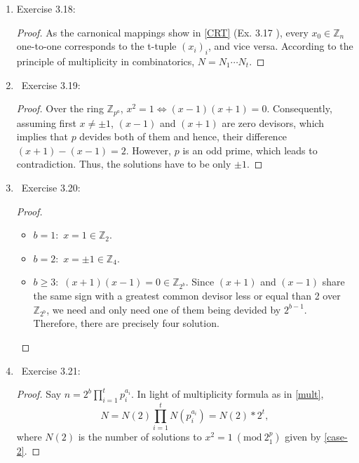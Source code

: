 \documentclass[11pt]{article}
\newcommand\0{\mathbf{0}}
\newcommand\ZZ{\mathbb{Z}}
\newcommand\<{\langle}
\renewcommand\>{\rangle}
\renewcommand\iff{\Leftrightarrow}
\renewcommand\mod[1]{\ (\mathrm{mod}\ #1)}
\begin{document}
\begin{enumerate}
\begin{proof}
  $(\Leftarrow)$: Assume that $f(x_i) \equiv 0 \mod{p_i^{a_i}}$ for each $i$. Equivalently speaking, $f(x_i) = 0 \in \ZZ_{p_i^{a_i}}$ with $x \in \ZZ_{p_i^{a_i}}$ and $f(x) \in \ZZ_{p_i^{a_i}}[x]$. In terms of \textbf{Chinese Remainder Theorem}, $p_i^{a_i}$ being pairwise relatively prime integers, we can find a unique $x_0 \in \ZZ_n$ such that $x_0 = x_i$ in $\ZZ_{p_i^{a_i}}$ as projecting $\ZZ_n \to \ZZ_{p_i^{a_i}}$ carnonically. Now embedding $\ZZ_{p_i^{a_i}}$ and $\ZZ_{p_i^{a_i}}[x]$ into $\ZZ_n$ and $\ZZ_n[x]$, respectively, we establish that $f(x_0) = 0 \in \ZZ_n$ since moreover,
  \[\ZZ_n = \oplus_{i=1}^{t} \ZZ_{p_i^{a_i}}.\]
  Remark that a ring-theoretic-free but equivalent arguement is as below: since $f(x_0) \equiv 0$ modulo every $p_i^{a_i}$, $f(x_0) \equiv 0$ modulo their least common multiple, write \[lcm_i(p_i^{a_i})= \displaystyle\prod_{i=1}^{t}{p_i^{a_i}}= n.\] 
\end{proof}
\item\label{mult}
Exercise 3.18:
\begin{proof}
  As the carnonical mappings show in \ref{CRT} (Ex. 3.17 ), every $x_0 \in \ZZ_n$ one-to-one corresponds to the t-tuple $(x_i)_i$, and vice versa. According to the principle of multiplicity in combinatorics, $N = N_1\cdots N_t.$
\end{proof}
\item\ 
Exercise 3.19:
\begin{proof}
  Over the ring $\ZZ_{p^a}$, $x^2 = 1 \iff (x-1)(x+1) = 0.$ Consequently, assuming first $x \neq \pm 1$, $(x-1)$ and $(x+1)$ are zero devisors, which implies that $p$ devides both of them and hence, their difference $(x+1) - (x-1) = 2.$ However, $p$ is an odd prime, which leads to contradiction. Thus, the solutions have to be only $\pm 1.$
\end{proof}
\item\
Exercise 3.20:
\begin{proof} \label{case-2}
  \begin{itemize}
    \item $b=1:$ $x = 1 \in \ZZ_2.$
    \item $b=2:$ $x = \pm 1 \in \ZZ_4.$
    \item $b \geq 3:$ $(x+1)(x-1) = 0 \in \ZZ_{2^b}.$ Since $(x+1)$ and $(x-1)$ share the same sign with a greatest common devisor less or equal than 2 over $\ZZ_{2^b}$, we need and only need one of them being devided by $2^{b-1}.$ Therefore, there are precisely four solution.
  \end{itemize}
\end{proof}
\item\ 
Exercise 3.21:
\begin{proof}
  Say $n = 2^b\displaystyle\prod_{i=1}^{t}{p_i^{a_i}}.$ In light of multiplicity formula as in \ref{mult}, \[N = N(2)\prod_{i = 1}^{t}N(p_i^{a_i}) = N(2)*2^t,\] where $N(2)$ is the number of solutions to $x^2 = 1 \mod{2^p_1}$ given by \ref{case-2}.
\end{proof}

\end{enumerate}
\end{document}
